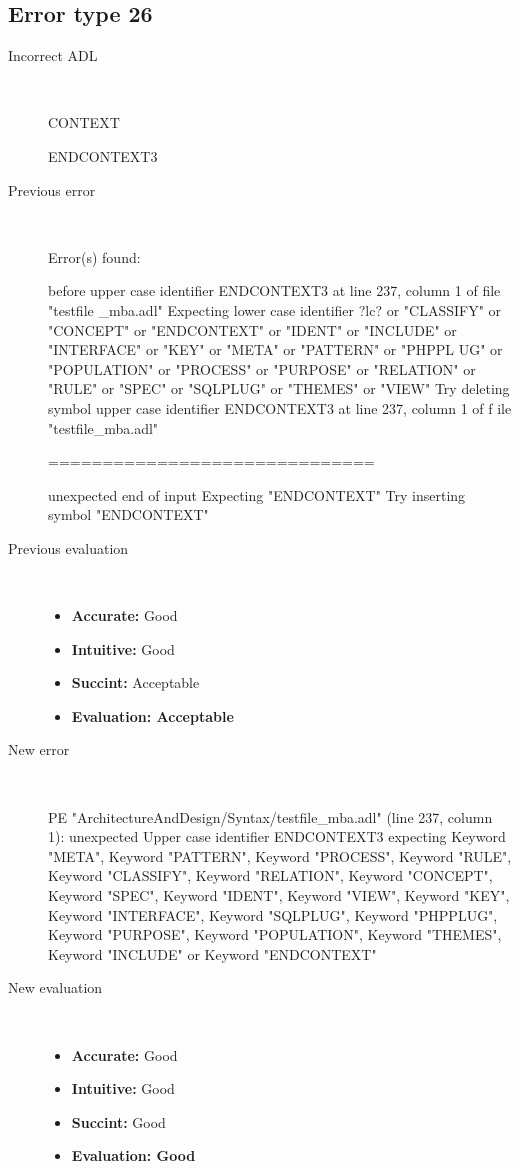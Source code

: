 \hrulefill

\subsection{Error type 26}
  \begin{description}
  \item[Incorrect ADL]~\\
\begin{adl}
CONTEXT

ENDCONTEXT3\end{adl}
  \item[Previous error]~\\
\begin{haskell}
Error(s) found:

before upper case identifier ENDCONTEXT3 at line 237, column 1 of file "testfile
_mba.adl"
Expecting lower case identifier ?lc? or "CLASSIFY" or "CONCEPT" or "ENDCONTEXT"
or "IDENT" or "INCLUDE" or "INTERFACE" or "KEY" or "META" or "PATTERN" or "PHPPL
UG" or "POPULATION" or "PROCESS" or "PURPOSE" or "RELATION" or "RULE" or "SPEC"
or "SQLPLUG" or "THEMES" or "VIEW"
Try deleting symbol upper case identifier ENDCONTEXT3 at line 237, column 1 of f
ile "testfile_mba.adl"

==============================

unexpected end of input
Expecting "ENDCONTEXT"
Try inserting symbol "ENDCONTEXT"
\end{haskell}
  \item[Previous evaluation]~\\
    \begin{itemize}
    \item \textbf{Accurate:} Good
    \item \textbf{Intuitive:} Good
    \item \textbf{Succint:} Acceptable
    \item \textbf{Evaluation: Acceptable}
    \end{itemize}
  \item[New error]~\\
\begin{haskell}
PE "ArchitectureAndDesign/Syntax/testfile_mba.adl" (line 237, column 1):
unexpected Upper case identifier ENDCONTEXT3
expecting Keyword "META", Keyword "PATTERN", Keyword "PROCESS", Keyword "RULE", Keyword "CLASSIFY", Keyword "RELATION", Keyword "CONCEPT", Keyword "SPEC", Keyword "IDENT", Keyword "VIEW", Keyword "KEY", Keyword "INTERFACE", Keyword "SQLPLUG", Keyword "PHPPLUG", Keyword "PURPOSE", Keyword "POPULATION", Keyword "THEMES", Keyword "INCLUDE" or Keyword "ENDCONTEXT"
\end{haskell}
  \item[New evaluation]~\\
    \begin{itemize}
    \item \textbf{Accurate:} Good
    \item \textbf{Intuitive:} Good
    \item \textbf{Succint:} Good
    \item \textbf{Evaluation: Good
}
    \end{itemize}
  \end{description}

